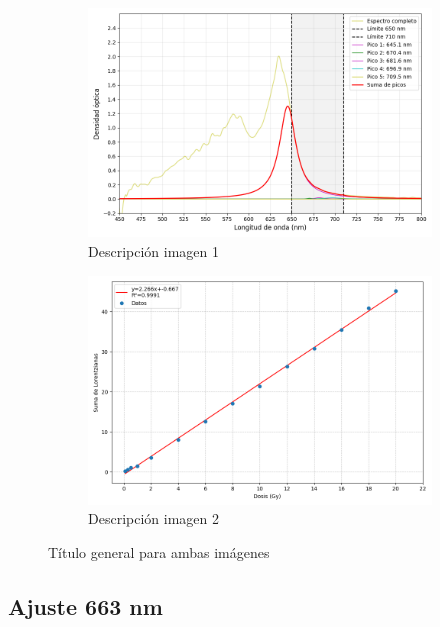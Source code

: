 \documentclass[onecolumn,12pt]{article} %
\begin{document}
\begin{figure}[H]
    \centering
    \begin{subfigure}[b]{0.45\textwidth}
        \centering
        \includegraphics[width=\textwidth]{img_Esp/Lorentz.png}
        \caption{Descripción imagen 1}
        \label{fig:img1}
    \end{subfigure}
    \hfill
    \begin{subfigure}[b]{0.5\textwidth}
        \centering
        \includegraphics[width=\textwidth]{img_Esp/LorentzCalib.png}
        \caption{Descripción imagen 2}
        \label{fig:img2}
    \end{subfigure}
    \caption{Título general para ambas imágenes}
    \label{fig:ambas}
\end{figure}


\subsection{Ajuste 663 nm}
\end{document}
